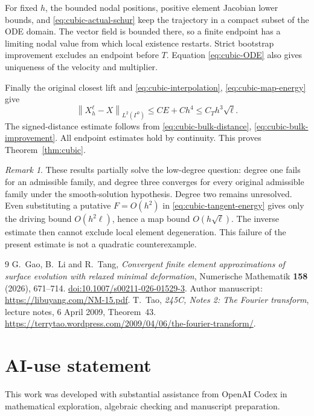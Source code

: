 \documentclass[11pt,a4paper]{article}
\numberwithin{equation}{section}
\theoremstyle{remark}
\newtheorem{remark}[theorem]{Remark}
\newcommand{\norm}[1]{\left\lVert #1\right\rVert}
\begin{document}
For fixed \(h\), the bounded nodal positions, positive element
Jacobian lower bounds, and \eqref{eq:cubic-actual-schur} keep the
trajectory in a compact subset of the ODE domain. The vector field
is bounded there, so a finite endpoint has a limiting nodal value
from which local existence restarts. Strict bootstrap improvement
excludes an endpoint before \(T\). Equation \eqref{eq:cubic-ODE}
also gives uniqueness of the velocity and multiplier.

Finally the original closest lift and
\eqref{eq:cubic-interpolation}, \eqref{eq:cubic-map-energy} give
\[
 \norm{X_h^\ell-X}_{L^2(\Gamma^0)}\leq CE+Ch^4
                      \leq C_T h^3\sqrt\ell.
\]
The signed-distance estimate follows from
\eqref{eq:cubic-bulk-distance}, \eqref{eq:cubic-bulk-improvement}.
All endpoint estimates hold by continuity. This proves
Theorem~\ref{thm:cubic}.

\begin{remark}\label{rem:quadratic-open}
These results partially solve the low-degree question: degree one
fails for an admissible family, and degree three converges for every
original admissible family under the smooth-solution hypothesis.
Degree two remains unresolved. Even substituting a putative
\(F=O(h^2)\) in \eqref{eq:cubic-tangent-energy} gives only the driving
bound \(O(h^2\ell)\), hence a map bound \(O(h\sqrt\ell)\).
The inverse estimate then cannot exclude local element degeneration.
This failure of the present estimate is not a quadratic counterexample.
\end{remark}

\begin{thebibliography}{9}
G.~Gao, B.~Li and R.~Tang,
\emph{Convergent finite element approximations of surface evolution
with relaxed minimal deformation},
Numerische Mathematik \textbf{158} (2026), 671--714.
\href{https://doi.org/10.1007/s00211-026-01529-3}{doi:10.1007/s00211-026-01529-3}.
Author manuscript:
\url{https://libuyang.com/NM-15.pdf}.
T.~Tao, \emph{245C, Notes 2: The Fourier transform},
lecture notes, 6 April 2009, Theorem~43.
\url{https://terrytao.wordpress.com/2009/04/06/the-fourier-transform/}.
\end{thebibliography}

\section*{AI-use statement}
This work was developed with substantial assistance from OpenAI Codex
in mathematical exploration, algebraic checking and manuscript preparation.
\end{document}
